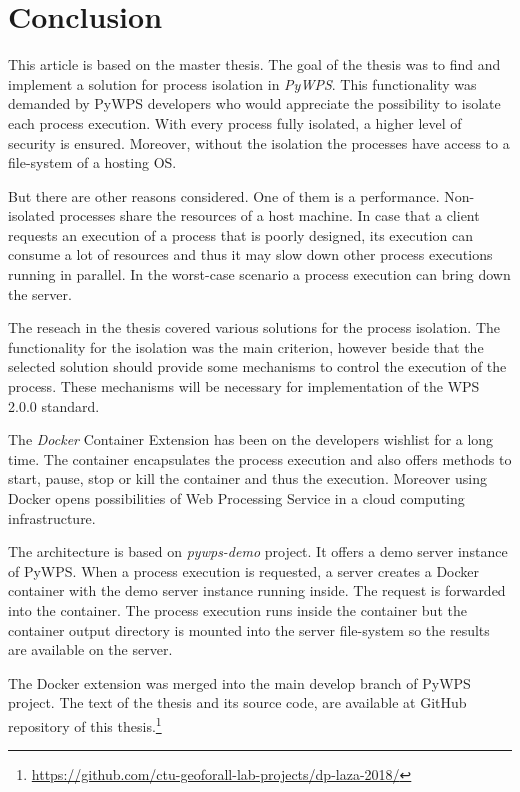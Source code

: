 \documentclass{gifce}
\begin{document}
\section{Conclusion}

This article is based on the master thesis. The goal of the thesis 
was to find and implement a solution for
process isolation in \textit{PyWPS}. This functionality was demanded
by PyWPS developers who would appreciate the possibility to isolate
each process execution. With every process fully isolated, a higher
level of security is ensured. Moreover, without the isolation the
processes have access to a file-system of a hosting OS.

But there are other reasons considered. One of them is a
performance. Non-isolated processes share the resources of a host
machine. In case that a client requests an execution of a process that
is poorly designed, its execution can consume a lot of resources and
thus it may slow down other process executions running in parallel. In
the worst-case scenario a process execution can bring down the server.

The reseach in the thesis covered various solutions for the process 
isolation. The functionality for the isolation was the main criterion, 
however beside that the selected solution should provide some mechanisms 
to control the execution of the process. These mechanisms will be 
necessary for implementation of the WPS 2.0.0 standard.

The \textit{Docker} Container Extension has been on the developers
wishlist for a long time. The container encapsulates the process
execution and also offers methods to start, pause, stop or kill the
container and thus the execution. Moreover using Docker opens
possibilities of Web Processing Service in a cloud computing
infrastructure.

The architecture is based on \textit{pywps-demo} project. It offers a
demo server instance of PyWPS. When a process execution is requested,
a server creates a Docker container with the demo server instance
running inside. The request is forwarded into the container. The
process execution runs inside the container but the container output
directory is mounted into the server file-system so the results are
available on the server.

The Docker extension was merged into the main develop branch of PyWPS project.
The text of the thesis and its source code,
are available at GitHub repository of this 
thesis.\footnote{\url{https://github.com/ctu-geoforall-lab-projects/dp-laza-2018/}}

\printbibliography[heading=subbibliography]
\cleardoublepage
\end{document}
